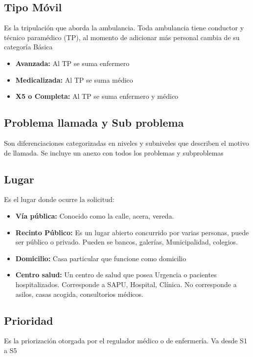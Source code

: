 \documentclass{article}
\begin{document}
\subsection{Tipo Móvil}
Es la tripulación que aborda la ambulancia. Toda ambulancia tiene conductor y técnico paramédico (TP), al momento de adicionar más personal cambia de su categoría Básica
\begin{itemize}
\item \textbf{Avanzada:} Al TP se suma enfermero
\item \textbf{Medicalizada:} Al TP se suma médico
\item \textbf{X5 o Completa:} Al TP se suma enfermero y médico
\end{itemize}


\subsection{Problema llamada y Sub problema}
Son diferenciaciones categorizadas en niveles y subniveles que describen el motivo de llamada. Se incluye un anexo con todos los problemas y subproblemas

\subsection{Lugar}
Es el lugar donde ocurre la solicitud:
\begin{itemize}
\item \textbf{Vía pública:} Conocido como la calle, acera, vereda. 
\item \textbf{Recinto Público:} Es un lugar abierto concurrido por varias personas, puede ser público o privado. Pueden se bancos, galerías, Municipalidad, colegios.
\item \textbf{Domicilio:} Casa particular que funcione como domicilio
\item \textbf{Centro salud:} Un centro de salud que posea Urgencia o pacientes hospitalizados. Corresponde a SAPU, Hospital, Clínica. No corresponde a asilos, casas acogida, consultorios médicos.

\end{itemize}


\subsection{Prioridad}
Es la priorización otorgada por el regulador médico o de enfermería. Va desde S1 a S5
\end{document}
